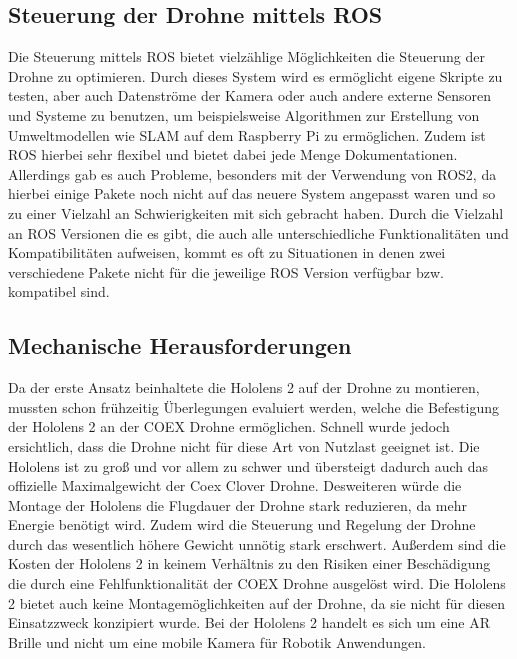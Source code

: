 \subsection{Steuerung der Drohne mittels ROS}\label{steuerung_drohne_ros:subsection}
Die Steuerung mittels \ac{ROS} bietet vielzählige Möglichkeiten die Steuerung der Drohne zu optimieren. Durch dieses System wird es ermöglicht eigene Skripte zu testen, aber auch Datenströme der Kamera oder auch andere externe Sensoren und Systeme zu benutzen, um beispielsweise Algorithmen zur Erstellung von Umweltmodellen wie \ac{SLAM} auf dem Raspberry Pi zu ermöglichen. Zudem ist \ac{ROS} hierbei sehr flexibel und bietet dabei jede Menge Dokumentationen.
Allerdings gab es auch Probleme, besonders mit der Verwendung von ROS2, da hierbei einige Pakete noch nicht auf das neuere System angepasst waren und so zu einer Vielzahl an Schwierigkeiten mit sich gebracht haben. Durch die Vielzahl an \ac{ROS} Versionen die es gibt, die auch alle unterschiedliche Funktionalitäten und Kompatibilitäten aufweisen, kommt es oft zu Situationen in denen zwei verschiedene Pakete nicht für die jeweilige \ac{ROS} Version verfügbar bzw. kompatibel sind.


\subsection{Mechanische Herausforderungen}\label{mechanische-herausforderungen:section}

Da der erste Ansatz beinhaltete die Hololens 2 auf der Drohne zu montieren, mussten schon frühzeitig Überlegungen evaluiert werden, welche die Befestigung der Hololens 2 an der COEX Drohne ermöglichen. Schnell wurde jedoch ersichtlich, dass die Drohne nicht für diese Art von Nutzlast geeignet ist. Die Hololens ist zu groß und vor allem zu schwer und übersteigt dadurch auch das offizielle Maximalgewicht der Coex Clover Drohne. Desweiteren würde die Montage der Hololens die Flugdauer der Drohne stark reduzieren, da mehr Energie benötigt wird. Zudem wird die Steuerung und Regelung der Drohne durch das wesentlich höhere Gewicht unnötig stark erschwert. Außerdem sind die Kosten der Hololens 2 in keinem Verhältnis zu den Risiken einer Beschädigung die durch eine Fehlfunktionalität der COEX Drohne ausgelöst wird. Die Hololens 2 bietet auch keine Montagemöglichkeiten auf der Drohne, da sie nicht für diesen Einsatzzweck konzipiert wurde. Bei der Hololens 2 handelt es sich um eine \ac{AR} Brille und nicht um eine mobile Kamera für Robotik Anwendungen.

